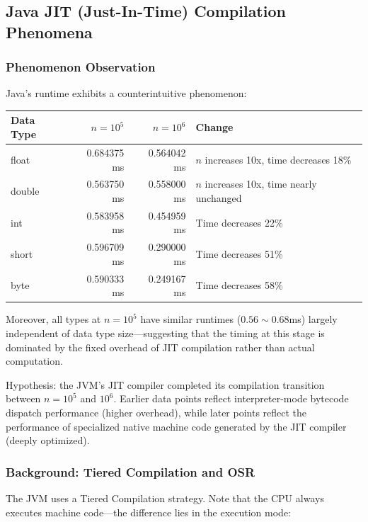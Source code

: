 \documentclass[12pt,a4paper]{article}
\begin{document}

\subsection{Java JIT (Just-In-Time) Compilation Phenomena}

\subsubsection{Phenomenon Observation}

Java's runtime exhibits a counterintuitive phenomenon:

\begin{table}[H]
\centering
\begin{tabular}{l r r l}
\toprule
Data Type & $n=10^5$ & $n=10^6$ & Change \\
\midrule
float  & 0.684375 ms & 0.564042 ms & $n$ increases 10x, time decreases 18\% \\
double & 0.563750 ms & 0.558000 ms & $n$ increases 10x, time nearly unchanged \\
int    & 0.583958 ms & 0.454959 ms & Time decreases 22\% \\
short  & 0.596709 ms & 0.290000 ms & Time decreases 51\% \\
byte   & 0.590333 ms & 0.249167 ms & Time decreases 58\% \\
\bottomrule
\end{tabular}
\end{table}

Moreover, all types at $n=10^5$ have similar runtimes ($0.56{\sim}0.68$ms) largely independent of data type size---suggesting that the timing at this stage is dominated by the fixed overhead of JIT compilation rather than actual computation.

Hypothesis: the JVM's JIT compiler completed its compilation transition between $n=10^5$ and $10^6$. Earlier data points reflect interpreter-mode bytecode dispatch performance (higher overhead), while later points reflect the performance of specialized native machine code generated by the JIT compiler (deeply optimized).

\subsubsection{Background: Tiered Compilation and OSR}

The JVM uses a Tiered Compilation strategy. Note that the CPU always executes machine code---the difference lies in the execution mode:
\end{document}
